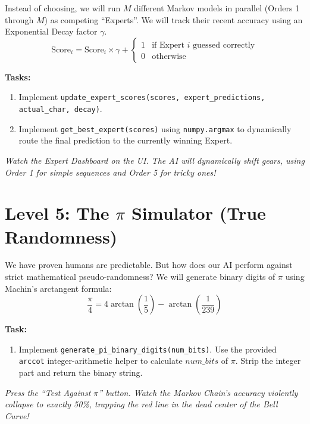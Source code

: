 \documentclass[12pt]{article}
\begin{document}
Instead of choosing, we will run $M$ different Markov models in parallel (Orders 1 through $M$) as competing ``Experts''. We will track their recent accuracy using an Exponential Decay factor $\gamma$.
$$ \text{Score}_{i} = \text{Score}_{i} \times \gamma + \begin{cases} 1 & \text{if Expert } i \text{ guessed correctly} \\ 0 & \text{otherwise} \end{cases} $$

\textbf{Tasks:}
\begin{enumerate}
    \item Implement \texttt{update\_expert\_scores(scores, expert\_predictions, actual\_char, decay)}.
    \item Implement \texttt{get\_best\_expert(scores)} using \texttt{numpy.argmax} to dynamically route the final prediction to the currently winning Expert.
\end{enumerate}
\textit{Watch the Expert Dashboard on the UI. The AI will dynamically shift gears, using Order 1 for simple sequences and Order 5 for tricky ones!}

\section{Level 5: The $\pi$ Simulator (True Randomness)}
We have proven humans are predictable. But how does our AI perform against strict mathematical pseudo-randomness?
We will generate binary digits of $\pi$ using Machin's arctangent formula:
$$ \frac{\pi}{4} = 4 \arctan\left(\frac{1}{5}\right) - \arctan\left(\frac{1}{239}\right) $$

\textbf{Task:}
\begin{enumerate}
    \item Implement \texttt{generate\_pi\_binary\_digits(num\_bits)}. Use the provided \texttt{arccot} integer-arithmetic helper to calculate $num\_bits$ of $\pi$. Strip the integer part and return the binary string.
\end{enumerate}
\textit{Press the ``Test Against $\pi$'' button. Watch the Markov Chain's accuracy violently collapse to exactly 50\%, trapping the red line in the dead center of the Bell Curve!}
\end{document}
